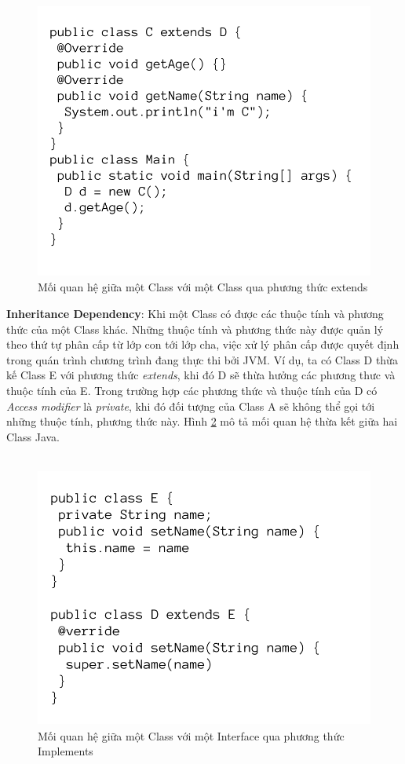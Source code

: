 \documentclass[12pt]{report}
\begin{document}
\begin{figure}[!htbp]
	\centering
	\includegraphics[scale=0.35]{images/CextendD}
	\caption{Mối quan hệ giữa một Class với một Class qua phương thức extends}
	\label{fig:CextendD}
\end{figure}
\newpage
\noindent \textbf{Inheritance Dependency}: Khi một Class có được các thuộc tính và phương thức của một Class khác. Những thuộc tính và phương thức này được quản lý theo thứ tự phân cấp từ lớp con tới lớp cha, việc xử lý phân cấp được quyết định trong quán trình chương trình đang thực thi bởi JVM. Ví dụ, ta có Class D thừa kế Class E với phương thức \textit{extends}, khi đó D sẽ thừa hưởng các phương thưc và thuộc tính của E. Trong trường hợp các phương thức và thuộc tính của D có \textit{Access modifier} là \textit{private}, khi đó đối tượng của Class A sẽ không thể gọi tới những thuộc tính, phương thức này. Hình \ref{fig:D_extends_E} mô tả mối quan hệ thừa kết giữa hai Class Java.\\\\
\begin{figure}[!htbp]
	\centering
	\vspace{-1.5cm}
	\includegraphics[scale=0.35]{images/D_extends_E}
	\caption{Mối quan hệ giữa một Class với một Interface qua phương thức Implements}
	\label{fig:D_extends_E}
\end{figure}\\
\end{document}

